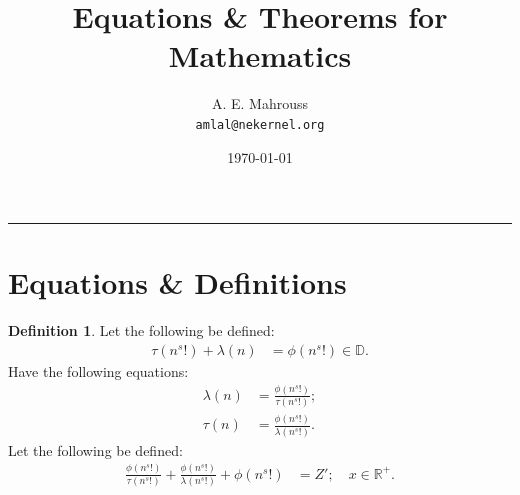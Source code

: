 \documentclass[10pt]{article}
\title{%
  \vspace{-1.5em}%
  \large\textbf{Equations \& Theorems for Mathematics}%
}
\author{A. E. Mahrouss\\\texttt{amlal@nekernel.org}}
\date{\today}
\theoremstyle{plain}
\theoremstyle{definition}
\newtheorem{definition}[theorem]{Definition}
\theoremstyle{remark}
\begin{document}
  \maketitle
\vspace{-0.5em}
\vspace{0.8em}
\rule{\linewidth}{0.4pt}
\vspace{1em}

\section{Equations \& Definitions}

\begin{definition}
	Let the following be defined:
\begin{align*}
		\tau(n^{s}!) + \lambda(n) &= \phi(n^{s}!) \in \mathbb{D}.		
\end{align*}
	Have the following equations:
	\begin{align*}
		\lambda(n) &= \frac{\phi(n^{s}!)}{\tau(n^{s}!)};\\
		\tau(n) &= \frac{\phi(n^{s}!)}{\lambda(n^{s}!)}.
	\end{align*}
	Let the following be defined:
	\begin{align*}
		\frac{\phi(n^{s}!)}{\tau(n^{s}!)} + \frac{\phi(n^{s}!)}{\lambda(n^{s}!)} + \phi(n^{s}!) &= Z'; \quad x \in \mathbb{R}^{+}.
	\end{align*}
\end{definition}

\nocite{*}



\end{document}
